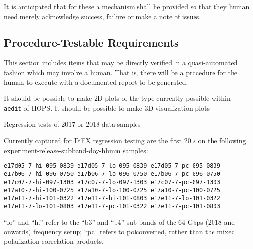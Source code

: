 It is anticipated that for these a mechanism shall be provided
so that they human need merely acknowledge success, failure or
make a note of issues.

\subsection{Procedure-Testable Requirements}
\label{sec:procedure}

This section includes items that may be directly verified in a quasi-automated
fashion which may involve a human.  That is, there will be a procedure for the
human to execute with a documented report to be generated.

\begin{description}
 It should be possible to make 2D plots of the type
    currently possible within \texttt{\ac{aedit}} of \ac{HOPS}.
 It should be possible to make 3D visualization plots

 Regression tests of 2017 or 2018 data samples

    \FIXME[more]

\end{description}

Currently captured for \ac{DiFX} regression testing are the first 20 s
on the following experiment-release-subband-doy-hhmm samples:
\begin{verbatim}
e17d05-7-hi-095-0839 e17d05-7-lo-095-0839 e17d05-7-pc-095-0839
e17b06-7-hi-096-0750 e17b06-7-lo-096-0750 e17b06-7-pc-096-0750
e17c07-7-hi-097-1303 e17c07-7-lo-097-1303 e17c07-7-pc-097-1303
e17a10-7-hi-100-0725 e17a10-7-lo-100-0725 e17a10-7-pc-100-0725
e17e11-7-hi-101-0322 e17e11-7-hi-101-0803 e17e11-7-lo-101-0322
e17e11-7-lo-101-0803 e17e11-7-pc-101-0322 e17e11-7-pc-101-0803
\end{verbatim}
``lo'' and ``hi'' refer to the ``b3'' and ``b4'' sub-bands of the
64 \acs{Gbps} (2018 and onwards) frequency setup; ``pc'' refers to polconverted,
rather than the mixed polarization correlation products.

